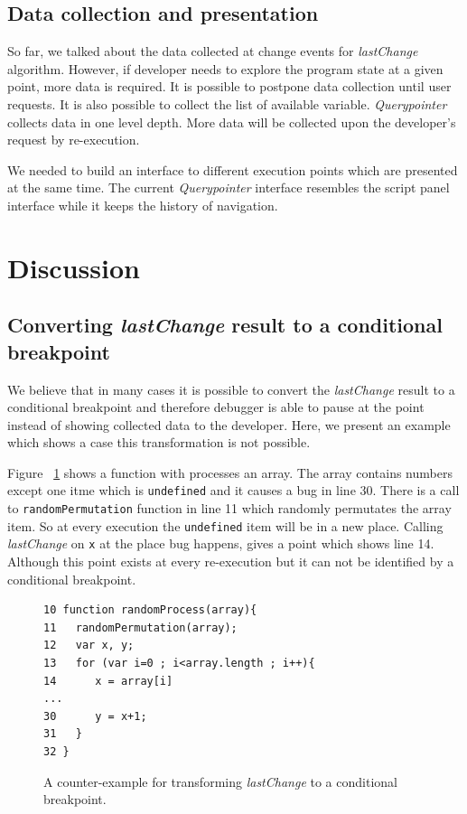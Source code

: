 \documentclass[preprint]{sigplanconf}
\begin{document}
\subsection{Data collection and presentation}
So far, we talked about the data collected at change events for
\textit{lastChange} algorithm. However, if developer needs to explore
the program state at a given point, more data is required. It is
possible to postpone data collection until user requests. It is also
possible to collect the list of available
variable. \textit{Querypointer} collects data in one level depth. More
data will be collected upon the developer's request by re-execution.

We needed to build an interface to different execution points which
are presented at the same time. The current \textit{Querypointer}
interface resembles the script panel interface while it keeps the
history of navigation.

\section{Discussion}
\subsection{Converting \textit{lastChange} result to a conditional breakpoint}
We believe that in many cases it is possible to convert the
\textit{lastChange} result to a conditional breakpoint and therefore
debugger is able to pause at the point instead of showing collected
data to the developer. Here, we present an example which shows a case
this transformation is not possible.

Figure ~\ref{fig:counter-example} shows a function with processes an
array. The array contains numbers except one itme which is
\texttt{undefined} and it causes a bug in line 30. There is a call to
\texttt{randomPermutation} function in line 11 which randomly
permutates the array item. So at every execution the
\texttt{undefined} item will be in a new place. Calling
\textit{lastChange} on \texttt{x} at the place bug happens, gives a
point which shows line 14. Although this point exists at every
re-execution but it can not be identified by a conditional breakpoint.

\begin{figure}[htp]
\begin{verbatim}
10 function randomProcess(array){
11   randomPermutation(array);
12   var x, y;
13   for (var i=0 ; i<array.length ; i++){
14      x = array[i]
...
30      y = x+1;
31   }
32 }
\end{verbatim}
\caption{A counter-example for transforming \textit{lastChange} to a conditional breakpoint.}
\label{fig:counter-example}
\end{figure}
 
\end{document}
